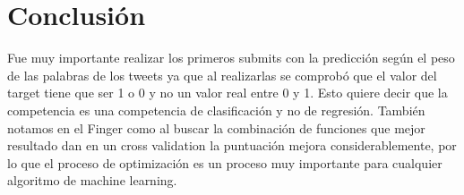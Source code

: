 \documentclass[12pt]{article}
\begin{document}

\newpage
\section{Conclusión}
Fue muy importante realizar los primeros submits con la predicción según el peso de las palabras de los tweets ya que al realizarlas se comprobó que el valor del target tiene que ser 1 o 0 y no un valor real entre 0 y 1. Esto quiere decir que la competencia es una competencia de clasificación y no de regresión.
También notamos en el Finger como al buscar la combinación de funciones que mejor resultado dan en un cross validation la puntuación mejora considerablemente, por lo que el proceso de optimización es un proceso muy importante para cualquier algoritmo de machine learning.
\end{document}
